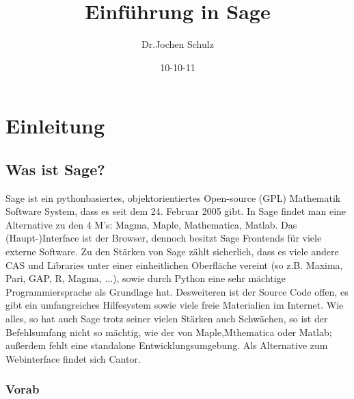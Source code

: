 \documentclass[fontsize=12pt,paper=a4,twoside,bibtotoc,idxtotoc,
liststotoc,pagesize,BCOR1.2cm,DIV15,chapterprefix,pagesize=pdftex]{scrbook}
\title{Einführung in Sage}
\author{Dr.Jochen Schulz}
\date{10-10-11}
\begin{document}
\maketitle
\tableofcontents

\chapter{Einleitung}
\section{Was ist Sage?}

Sage ist ein pythonbasiertes, objektorientiertes Open-source (GPL) Mathematik Software System, dass es seit dem 24. Februar 2005 gibt.
In Sage findet man eine Alternative zu den 4 M's: Magma, Maple, Mathematica, Matlab.\newline
Das (Haupt-)Interface ist der Browser, dennoch besitzt Sage Frontends für viele externe Software.\newline
Zu den Stärken von Sage zählt sicherlich, dass es viele andere CAS und Libraries unter einer einheitlichen Oberfl\"ache vereint 
(so z.B. Maxima, Pari, GAP, R, Magma, ...), sowie durch Python eine sehr mächtige Programmiersprache als Grundlage hat. Desweiteren 
ist der Source Code offen, es gibt ein umfangreiches Hilfesystem sowie viele freie Materialien im Internet.\newline
Wie alles, so hat auch Sage trotz seiner vielen Stärken auch Schwächen, so ist der Befehlsumfang nicht so mächtig, wie der von Maple,Mthematica 
oder Matlab; außerdem fehlt eine standalone Entwicklungsumgebung. Als Alternative zum Webinterface findet sich Cantor.

\subsection{Vorab}
\end{document}
